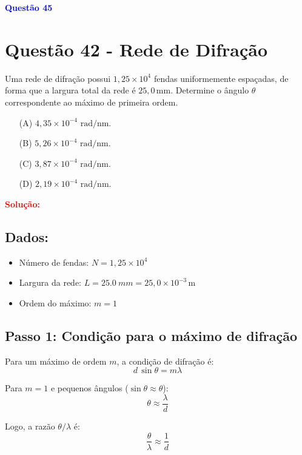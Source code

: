 \documentclass[a4paper,12pt]{article}
\begin{document}
\begin{flushleft}
\textbf{\textcolor{blue}{\Large Quest\~ao 45 }}\\
\noindent
\section{Quest\~ao 42 - Rede de Difração}
Uma rede de difração possui \( 1{,}25 \times 10^{4} \) fendas uniformemente espaçadas, de forma que a largura total da rede é \( 25,0\,\mathrm{mm} \).  
Determine o ângulo \( \theta \) correspondente ao máximo de primeira ordem.

\begin{itemize}
\item[(A)] $4{,}35 \times 10^{-4} \textrm{ rad/nm}$.
\item[(B)] $5{,}26 \times 10^{-4} \textrm{ rad/nm}$.
\item[(C)] $3{,}87 \times 10^{-4} \textrm{ rad/nm}$.
\item[(D)] $2{,}19 \times 10^{-4} \textrm{ rad/nm}$.
\end{itemize}

\vspace{0.5cm}

\textcolor{red}{\textbf{Solução:}}\\

\subsection*{Dados:}
\begin{itemize}
    \item Número de fendas: \( N = 1{,}25 \times 10^4 \)
    \item Largura da rede: \( L = \SI{25,0}{mm} = 25,0 \times 10^{-3}\,\mathrm{m} \)
    \item Ordem do máximo: \( m = 1 \)
\end{itemize}

\subsection*{Passo 1: Condição para o máximo de difração}

Para um máximo de ordem \(m\), a condição de difração é:
\[
d \, \sin\theta = m\lambda
\]

Para \(m=1\) e pequenos ângulos (\( \sin\theta \approx \theta \)):
\[
\theta \approx \frac{\lambda}{d}
\]

Logo, a razão \( \theta/\lambda \) é:
\[
\frac{\theta}{\lambda} \approx \frac{1}{d}
\]


\end{flushleft}
\end{document}
